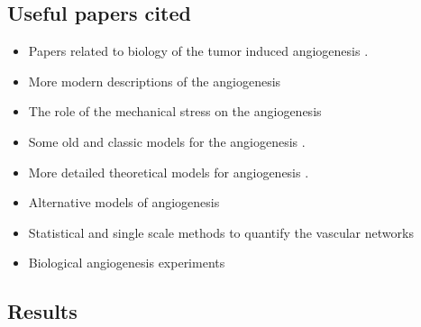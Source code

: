 \subsection{Useful papers cited}
\begin{itemize}
	\item Papers related to biology of the tumor induced angiogenesis \cite{Gupta2003,Folkman1971}.
	\item More modern descriptions of the angiogenesis \cite{Lugano2020,Saman2020}
	\item The role of the mechanical stress on the angiogenesis \cite{Li2005,Li2002,Vavourakis2017}
	\item Some old and classic models for the angiogenesis \cite{Anderson1998,Balding1985,Byrne1995,Stokes1991}.
	\item More detailed theoretical models for angiogenesis \cite{Byrne2010,Hadjicharalambous2021,Metzcar2019,Scianna2013}.
	\item Alternative models of angiogenesis \cite{Vilanova2017,Stepanova2021,Perfahl2017,Grogan2017,Vavourakis2017,Cai2017,Sefidgar2015}
	\item Statistical and single scale methods to quantify the vascular networks \cite{Perfahl2017,Folarin2010,Kannan2018,Konerding1999,Konerding2001}
	\item Biological angiogenesis experiments \cite{Bauer2007}
\end{itemize}




\subsection{Results}




	
	
	

\let\section\oldsection
